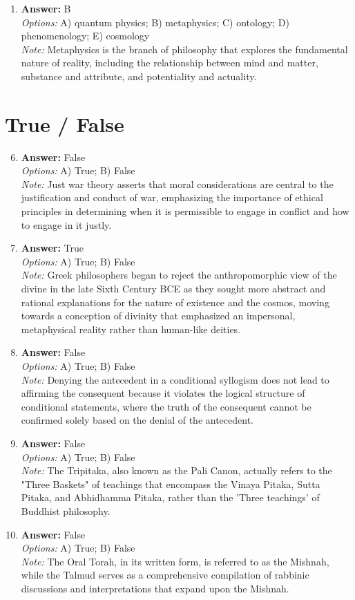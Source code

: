 \documentclass[12pt]{article}
\begin{document}
\begin{enumerate}[label=\arabic*.]
\item \textbf{Answer:} B
\\ \textit{Options:} A) quantum physics; B) metaphysics; C) ontology; D) phenomenology; E) cosmology
\\ \textit{Note:} Metaphysics is the branch of philosophy that explores the fundamental nature of reality, including the relationship between mind and matter, substance and attribute, and potentiality and actuality.
\end{enumerate}

\section*{True / False}
\begin{enumerate}[label=\arabic*.]
\setcounter{enumi}{5}
\item \textbf{Answer:} False
\\ \textit{Options:} A) True; B) False
\\ \textit{Note:} Just war theory asserts that moral considerations are central to the justification and conduct of war, emphasizing the importance of ethical principles in determining when it is permissible to engage in conflict and how to engage in it justly.
\item \textbf{Answer:} True
\\ \textit{Options:} A) True; B) False
\\ \textit{Note:} Greek philosophers began to reject the anthropomorphic view of the divine in the late Sixth Century BCE as they sought more abstract and rational explanations for the nature of existence and the cosmos, moving towards a conception of divinity that emphasized an impersonal, metaphysical reality rather than human-like deities.
\item \textbf{Answer:} False
\\ \textit{Options:} A) True; B) False
\\ \textit{Note:} Denying the antecedent in a conditional syllogism does not lead to affirming the consequent because it violates the logical structure of conditional statements, where the truth of the consequent cannot be confirmed solely based on the denial of the antecedent.
\item \textbf{Answer:} False
\\ \textit{Options:} A) True; B) False
\\ \textit{Note:} The Tripitaka, also known as the Pali Canon, actually refers to the "Three Baskets" of teachings that encompass the Vinaya Pitaka, Sutta Pitaka, and Abhidhamma Pitaka, rather than the 'Three teachings' of Buddhist philosophy.
\item \textbf{Answer:} False
\\ \textit{Options:} A) True; B) False
\\ \textit{Note:} The Oral Torah, in its written form, is referred to as the Mishnah, while the Talmud serves as a comprehensive compilation of rabbinic discussions and interpretations that expand upon the Mishnah.
\end{enumerate}
\end{document}
